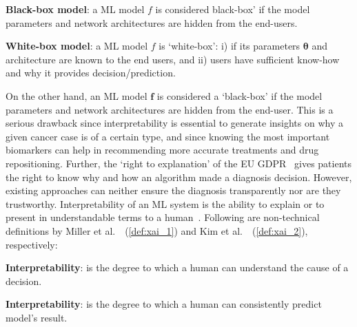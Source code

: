 \begin{definition}
    \textbf{Black-box model}: a ML model $f$ is considered      black-box' if the model parameters and network architectures are hidden from the end-users. 
\end{definition}
\begin{definition}
    \textbf{White-box model}: a ML model $f$ is `white-box': i) if its parameters $\boldsymbol{\theta}$ and architecture are known to the end users, and ii) users have sufficient know-how and why it provides decision/prediction.  
\end{definition}

\hspace*{3.5mm} On the other hand, an ML model $\boldsymbol{f}$ is considered a `black-box' if the model parameters and network architectures are hidden from the end-user. This is a serious drawback since interpretability is essential to generate insights on why a given cancer case is of a certain type, and since knowing the most important biomarkers can help in recommending more accurate treatments and drug repositioning. Further, the `right to explanation' of the EU GDPR~\cite{kaminski2019right} gives patients the right to know why and how an algorithm made a diagnosis decision. However, existing approaches can neither ensure the diagnosis transparently nor are they trustworthy. 
Interpretability of an ML system is the ability to explain or to present in understandable terms to a human~\cite{doshi2017towards}. Following are non-technical definitions by Miller et al.~\cite{XAI_miller}~(\cref{def:xai_1}) and Kim et al.~\cite{XAI_kim}~(\cref{def:xai_2}), respectively:

\begin{definition}
    \textbf{Interpretability}: is the degree to which a human can understand the cause of a decision.
    \label{def:xai_1}
\end{definition}
\vspace{-6mm}
\begin{definition}
    \textbf{Interpretability}: is the degree to which a human can consistently predict model's result.
    \label{def:xai_2}
\end{definition}

